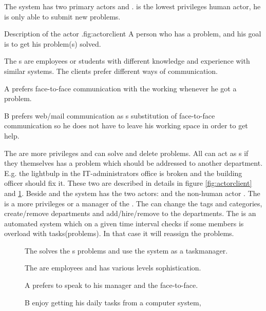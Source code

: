 The system has two primary actors \aclient{} and \astaff. \aclient[c] is the lowest privileges human actor, he is only able to submit new problems. 

\begin{sadlist}[h]{\Aclient}{Description of the actor \aclient.}{fig:actorclient}
 A person who has a problem, and his goal is to get his problem(s) solved.

 The \aclient{}s are employees or students with different knowledge and experience with similar systems. The clients prefer different ways of communication.%

 \Aclient{} A prefers face-to-face communication with the working \astaff{} whenever he got a problem. 

\aclient[c] B prefers web/mail communication as s substitution of face-to-face communication so he does not have to leave his working space in order to get help. 

\end{sadlist}


The \astaff{} are more privileges and can solve and delete problems. 
All \astaff{} can act as \aclient{}s if they themselves has a problem which should be addressed to another department. 
E.g. the lightbulp in the IT-administrators office is broken and the building officer should fix it. 
These two are described in details in figure \ref{fig:actorclient} and \ref{fig:actorstaff}. 
Beside \astaff{} and \aclient{} the system has the two actors: \sadmin{} and the non-human actor \wmon. 
The \sadmin{} is a more privileges \astaff{} or a manager of the \astaff. 
The \sadmin{} can change the tags and categories, create/remove departments and add/hire/remove \astaff{} to the departments. 
The \wmon[] is an automated system which on a given time interval checks if some \astaff{} members is overload with tasks(problems). 
In that case it will reassign the problems.




\begin{figure}[h]

\begin{sadlistar}{\Astaff}

 The \astaff{} solves the \aclient[]s problems and use the system as a taskmanager.  

 The \astaff[] are employees and has various levels sophistication.

 \astaff[c] A prefers to speak to his manager and the \aclient[] face-to-face.

\astaff[c] B enjoy getting his daily tasks from a computer system, 
 \end{sadlistar}
 \caption{}
 \label{fig:actorstaff}
 \end{figure}